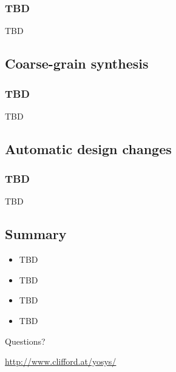 \subsubsection{TBD}

\begin{frame}{\subsubsecname}
TBD
\end{frame}


\subsection{Coarse-grain synthesis}

\begin{frame}
\subsectionpage
\subsectionpagesuffix
\end{frame}

\subsubsection{TBD}

\begin{frame}{\subsubsecname}
TBD
\end{frame}


\subsection{Automatic design changes}

\begin{frame}
\subsectionpage
\subsectionpagesuffix
\end{frame}

\subsubsection{TBD}

\begin{frame}{\subsubsecname}
TBD
\end{frame}


\subsection{Summary}

\begin{frame}{\subsecname}
\begin{itemize}
\item TBD
\item TBD
\item TBD
\item TBD
\end{itemize}

\bigskip
\bigskip
\begin{center}
Questions?
\end{center}

\bigskip
\bigskip
\begin{center}
\url{http://www.clifford.at/yosys/}
\end{center}
\end{frame}

